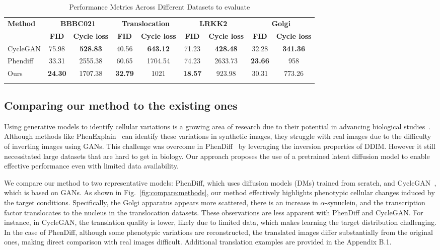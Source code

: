\begin{table*}[htbp]
\centering
\caption{Performance Metrics Across Different Datasets to evaluate}
\begin{tabular}{lcc|cc|cc|cc}
\toprule
\multirow{2}{*}{\textbf{Method}} & \multicolumn{2}{c|}{\textbf{BBBC021}} & \multicolumn{2}{c|}{\textbf{Translocation}} & \multicolumn{2}{c|}{\textbf{LRKK2}} & \multicolumn{2}{c}{\textbf{Golgi}} \\
& \textbf{FID} & \textbf{Cycle loss} & \textbf{FID} & \textbf{Cycle loss} & \textbf{FID} & \textbf{Cycle loss} & \textbf{FID} & \textbf{Cycle loss} \\
\midrule
CycleGAN & 75.98 & \textbf{528.83} & 40.56 & \textbf{643.12} & 71.23 & \textbf{428.48} & 32.28 & \textbf{341.36} \\
Phendiff & 33.31 & 2555.38 & 60.65 & 1704.54 & 74.23 & 2633.73 & \textbf{23.66} & 958 \\
Ours & \textbf{24.30} & 1707.38 & \textbf{32.79} & 1021 & \textbf{18.57} & 923.98 & 30.31 & 773.26 \\
\bottomrule
\label{tab:FID}
\end{tabular}
\end{table*}

\subsection{Comparing our method to the existing ones}
Using generative models to identify cellular variations is a growing area of research due to their potential in advancing biological studies~\cite{Lamiable2023, bourou_1, bourou_2}. Although methods like PhenExplain~\cite{Lamiable2023} can identify these variations in synthetic images, they struggle with real images due to the difficulty of inverting images using GANs. This challenge was overcome in PhenDiff~\cite{bourou_2} by leveraging the inversion properties of DDIM. However it still necessitated large datasets that are hard to get in biology. Our approach proposes the use of a pretrained latent diffusion model to enable effective performance even with limited data availability.

We compare our method to two representative models: PhenDiff, which uses diffusion models (DMs) trained from scratch, and CycleGAN~\cite{cyclegan}, which is based on GANs. As shown in Fig.~\ref{fig:compare:methods}, our method effectively highlights phenotypic cellular changes induced by the target conditions. Specifically, the Golgi apparatus appears more scattered, there is an increase in $\alpha$-synuclein, and the transcription factor translocates to the nucleus in the translocation datasets. These observations are less apparent with PhenDiff and CycleGAN. For instance, in CycleGAN, the translation quality is lower, likely due to limited data, which makes learning the target distribution challenging. In the case of PhenDiff, although some phenotypic variations are reconstructed, the translated images differ substantially from the original ones, making direct comparison with real images difficult. Additional translation examples are provided in the Appendix B.1. 

